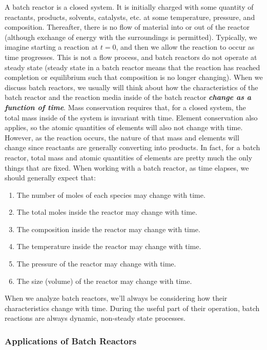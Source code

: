 \documentclass[11pt]{article}
\providecommand{\tightlist}{%
      \setlength{\itemsep}{0pt}\setlength{\parskip}{0pt}}
\begin{document}
A batch reactor is a closed system. It is initially charged with some
quantity of reactants, products, solvents, catalysts, etc. at some
temperature, pressure, and composition. Thereafter, there is no flow of
material into or out of the reactor (although exchange of energy with
the surroundings is permitted). Typically, we imagine starting a
reaction at \(t = 0\), and then we allow the reaction to occur as time
progresses. This is not a flow process, and batch reactors do not
operate at steady state (steady state in a batch reactor means that the
reaction has reached completion or equilibrium such that composition is
no longer changing). When we discuss batch reactors, we usually will
think about how the characteristics of the batch reactor and the
reaction media inside of the batch reactor \textbf{\emph{change as a
function of time}}. Mass conservation requires that, for a closed
system, the total mass inside of the system is invariant with time.
Element conservation also applies, so the atomic quantities of elements
will also not change with time. However, as the reaction occurs, the
nature of that mass and elements will change since reactants are
generally converting into products. In fact, for a batch reactor, total
mass and atomic quantities of elements are pretty much the only things
that are fixed. When working with a batch reactor, as time elapses, we
should generally expect that:

\begin{enumerate}
\def\labelenumi{\arabic{enumi}.}
\tightlist
\item
  The number of moles of each species may change with time.
\item
  The total moles inside the reactor may change with time.
\item
  The composition inside the reactor may change with time.
\item
  The temperature inside the reactor may change with time.
\item
  The pressure of the reactor may change with time.
\item
  The size (volume) of the reactor may change with time.
\end{enumerate}

When we analyze batch reactors, we'll always be considering how their
characteristics change with time. During the useful part of their
operation, batch reactions are always dynamic, non-steady state
processes.

\hypertarget{applications-of-batch-reactors}{%
\subsubsection{Applications of Batch
Reactors}\label{applications-of-batch-reactors}}
\end{document}
